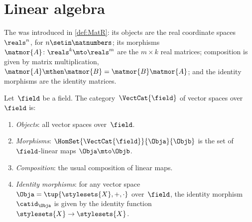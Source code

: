 

\section[Linear algebra]{Linear algebra}
\label{sec:cats-of-linear-algebra}

The  \MatR was introduced in \cref{def:MatR}: its objects are the real coordinate spaces $\reals^n$, for $n \setin \natnumbers$; its morphisms $\matmor{A} \colon \reals^k \mto \reals^m$ are the $m \times k$ real matrices; composition is given by matrix multiplication, $\matmor{A} \mthen \matmor{B} = \matmor{B}\matmor{A}$; and the identity morphisms are the identity matrices.

\begin{ctdefinition}
    \label{def:cat-of-vector-spaces}
    \label{def:cat-of-real-vector-spaces}
    Let~$\field$ be a field.
    The category~$\VectCat{\field}$ of vector spaces over~$\field$ is:
    \begin{enumerate}
        \item \emph{Objects}: all vector spaces over~$\field$.
        \item \emph{Morphisms}: $\HomSet{\VectCat{\field}}{\Obja}{\Objb}$ is the set of $\field$-linear maps $\Obja \mto \Objb$.
        \item \emph{Composition}: the usual composition of linear maps.
        \item \emph{Identity morphisms}: for any vector space~$\Obja = \tup{\stylesets{X}, +,{{ \cdot}}}$ over~$\field$, the identity morphism $\catid_\Obja$ is given by the identity function $\stylesets{X} \to \stylesets{X}$.
    \end{enumerate}
\end{ctdefinition}

